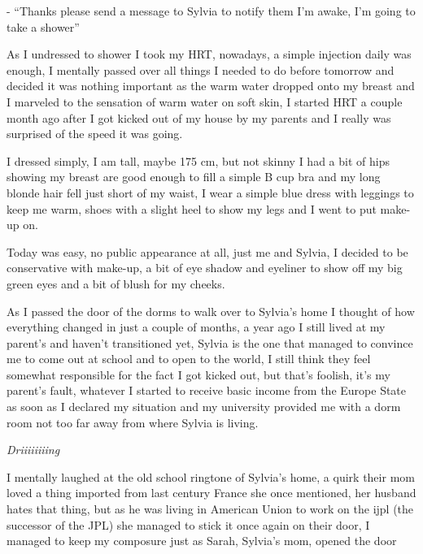 \documentclass[colorlinks,12pt,a4paper]{book}
\begin{document}
- “Thanks please send a message to Sylvia to notify them I'm awake, I'm going to take a shower”\par
\bigskip
As I undressed to shower I took my HRT, nowadays, a simple injection daily was enough, 
I mentally passed over all things I needed to do before tomorrow and decided it was nothing 
important as the warm water dropped onto my breast and I marveled to the sensation of warm water on soft skin, 
I started HRT a couple month ago after I got kicked out of my house by my parents and 
I really was surprised of the speed it was going.\par
\bigskip

I dressed simply, I am tall, maybe 175 cm, 
but not skinny I had a bit of hips showing my breast are good enough to fill a simple B cup bra and 
my long blonde hair fell just short of my waist, I wear a simple blue dress with leggings to keep me warm, 
shoes with a slight heel to show my legs and I went to put make-up on.\par
\bigskip

Today was easy, no public appearance at all, just me and Sylvia, I decided to be conservative with make-up, 
a bit of eye shadow and eyeliner to show off my big green eyes and a bit of blush for my cheeks.\par
\bigskip

As I passed the door of the dorms to walk over to Sylvia's home 
I thought of how everything changed in just a couple of months, a year ago I still lived at my parent's 
and haven't transitioned yet, Sylvia is the one that managed to convince me to come out at school and to open to the world, 
I still think they feel somewhat responsible for the fact I got kicked out, but that's foolish, it's my parent's fault, 
whatever I started to receive basic income from the Europe State as soon as I declared my situation and my 
university provided me with a dorm room not too far away from where Sylvia is living.\par
\bigskip

\textit{Driiiiiiiing}\par
I mentally laughed at the old school ringtone of Sylvia's home, 
a quirk their mom loved a thing imported from last century France she once mentioned, 
her husband hates that thing, but as he was living in American Union to work on the 
\gls{ijpl} (the successor of the JPL) she managed to stick it once again on their door, 
I managed to keep my composure just as Sarah, Sylvia's mom, opened the door\par
\bigskip
\end{document}
